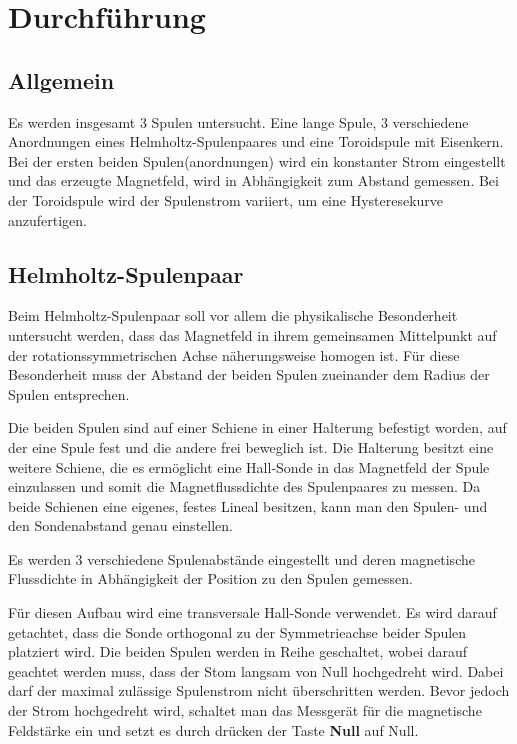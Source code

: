 \section{Durchführung}
\label{sec:Durchführung}

\subsection{Allgemein}
Es werden insgesamt 3 Spulen untersucht. Eine lange Spule, 3 verschiedene Anordnungen eines Helmholtz-Spulenpaares und eine Toroidspule mit Eisenkern.
Bei der ersten beiden Spulen(anordnungen) wird ein konstanter Strom eingestellt und das erzeugte Magnetfeld, wird in Abhängigkeit zum Abstand gemessen.
Bei der Toroidspule wird der Spulenstrom variiert, um eine Hysteresekurve anzufertigen.

\subsection{Helmholtz-Spulenpaar}

Beim Helmholtz-Spulenpaar soll vor allem die physikalische Besonderheit untersucht werden, dass das Magnetfeld in ihrem gemeinsamen Mittelpunkt auf der
rotationssymmetrischen Achse näherungsweise homogen ist. 
Für diese Besonderheit muss der Abstand der beiden Spulen zueinander dem Radius der Spulen entsprechen.

Die beiden Spulen sind auf einer Schiene in einer Halterung befestigt worden, auf der eine Spule fest und die andere frei beweglich ist. 
Die Halterung besitzt eine weitere Schiene, die es ermöglicht eine Hall-Sonde in das Magnetfeld der Spule einzulassen und somit die
Magnetflussdichte des Spulenpaares zu messen. Da beide Schienen eine eigenes, festes Lineal besitzen, kann man den Spulen- und den Sondenabstand
genau einstellen.

Es werden 3 verschiedene Spulenabstände eingestellt und deren magnetische Flussdichte in Abhängigkeit der Position zu den Spulen gemessen.

Für diesen Aufbau wird eine transversale Hall-Sonde verwendet. Es wird darauf getachtet, dass die Sonde orthogonal zu der Symmetrieachse beider
Spulen platziert wird. Die beiden Spulen werden in Reihe geschaltet, wobei darauf geachtet werden muss, dass der Stom langsam von Null hochgedreht
wird. Dabei darf der maximal zulässige Spulenstrom nicht überschritten werden. Bevor jedoch der Strom hochgedreht wird, schaltet man das Messgerät
für die magnetische Feldstärke ein und setzt es durch drücken der Taste \textbf{Null} auf Null.

